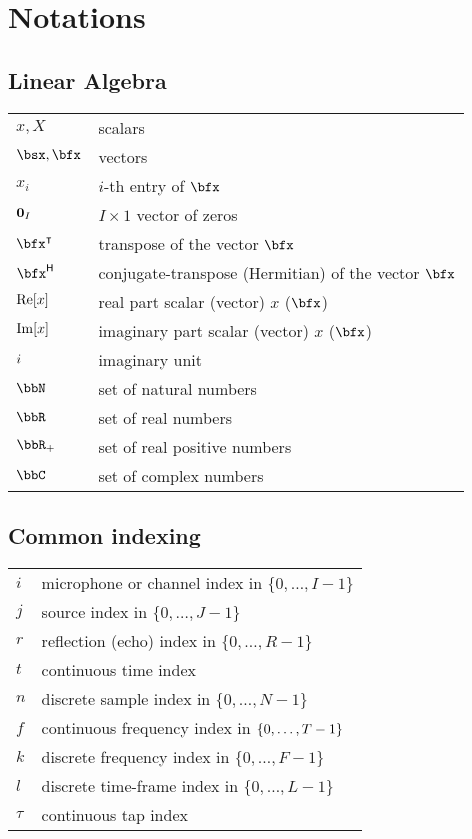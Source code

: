 \chapter*{Notations}\label{ch:notation}

\section*{Linear Algebra}
\begin{table}[H]
    \begin{tabular}{ll}
        $x, X$     & scalars      \\
        $\bsx, \bfx$  & vectors      \\
        $x_i$   & $i$-th entry of $\bfx$ \\
        $\mathbf{0}_I$ & $I\times1$ vector of zeros\\
        $\ktranspose{\bfx}$   & transpose of the vector $\bfx$ \\
        $\khermitian{\bfx}$   & conjugate-transpose (Hermitian) of the vector $\bfx$ \\
        $\operatorname{Re}[x]$ & real part scalar (vector) $x$ ($\bfx$) \\
        $\operatorname{Im}[x]$ & imaginary part scalar (vector) $x$ ($\bfx$) \\
        ${i}$  & imaginary unit \\
        $\bbN$    & set of natural numbers \\
        $\bbR$    & set of real numbers \\
        $\bbR_{+}$  & set of real positive numbers \\
        $\bbC$      & set of complex numbers \\
    \end{tabular}
\end{table}

\section*{Common indexing}
\begin{table}[H]
    \begin{tabular}{ll}
        $i$     & microphone or channel index in $\{0, \ldots, I-1\}$      \\
        $j$     & source index in $\{0, \ldots, J-1\}$      \\
        $r$     & reflection (echo) index in $\{0, \ldots, R-1\}$      \\
        $t$     & continuous time index\\
        $n$     & discrete sample index in $\{0, \ldots, N-1\}$ \\
        $f$     & continuous frequency index in $\set{0, \ldots, T-1}$\\
        $k$     & discrete frequency index in $\{0, \ldots, F-1\}$ \\
        $l$     & discrete time-frame index in $\{0, \ldots, L-1\}$\\
        $\tau$  & continuous tap index
    \end{tabular}
\end{table}


